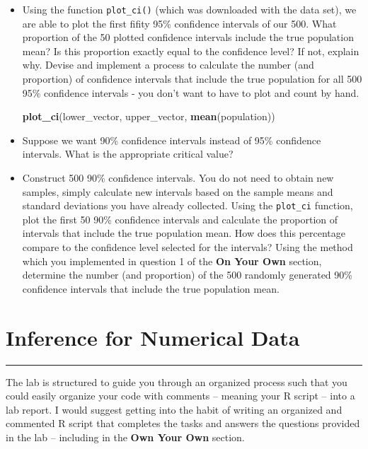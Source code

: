 \documentclass[]{book}
\newenvironment{Shaded}{\begin{snugshade}}{\end{snugshade}}
\newcommand{\KeywordTok}[1]{\textcolor[rgb]{0.13,0.29,0.53}{\textbf{{#1}}}}
\newcommand{\NormalTok}[1]{{#1}}
\theoremstyle{definition}
\theoremstyle{definition}
\theoremstyle{definition}
\theoremstyle{remark}
\begin{document}
\begin{itemize}
\item
  Using the function \texttt{plot\_ci()} (which was downloaded with the
  data set), we are able to plot the first fifity 95\% confidence
  intervals of our 500. What proportion of the 50 plotted confidence
  intervals include the true population mean? Is this proportion exactly
  equal to the confidence level? If not, explain why. Devise and
  implement a process to calculate the number (and proportion) of
  confidence intervals that include the true population for all 500 95\%
  confidence intervals - you don't want to have to plot and count by
  hand.

\begin{Shaded}
\begin{Highlighting}[]
\KeywordTok{plot_ci}\NormalTok{(lower_vector, upper_vector, }\KeywordTok{mean}\NormalTok{(population))}
\end{Highlighting}
\end{Shaded}
\item
  Suppose we want 90\% confidence intervals instead of 95\% confidence
  intervals. What is the appropriate critical value?
\item
  Construct 500 90\% confidence intervals. You do not need to obtain new
  samples, simply calculate new intervals based on the sample means and
  standard deviations you have already collected. Using the
  \texttt{plot\_ci} function, plot the first 50 90\% confidence
  intervals and calculate the proportion of intervals that include the
  true population mean. How does this percentage compare to the
  confidence level selected for the intervals? Using the method which
  you implemented in question 1 of the \textbf{On Your Own} section,
  determine the number (and proportion) of the 500 randomly generated
  90\% confidence intervals that include the true population mean.
\end{itemize}

\chapter{Inference for Numerical
Data}\label{inference-for-numerical-data}

\begin{center}\rule{0.5\linewidth}{\linethickness}\end{center}

The lab is structured to guide you through an organized process such
that you could easily organize your code with comments -- meaning your R
script -- into a lab report. I would suggest getting into the habit of
writing an organized and commented R script that completes the tasks and
answers the questions provided in the lab -- including in the
\textbf{Own Your Own} section.
\end{document}
